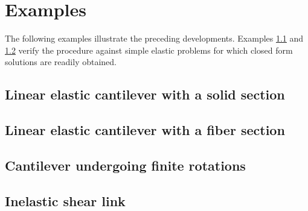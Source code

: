 \section{Examples}
The following examples illustrate the preceding developments. 
Examples \ref{sec:frame-0001} and \ref{sec:frame-0002} verify the procedure against simple elastic problems for which closed form solutions are readily obtained. 

\subsection{Linear elastic cantilever with a solid section }
\label{sec:frame-0001}


\subsection{Linear elastic cantilever with a fiber section }
\label{sec:frame-0002}


\subsection{Cantilever undergoing finite rotations }\label{sec:frame-1001}


\subsection{Inelastic shear link}
\label{sec:frame-0013}
% 


